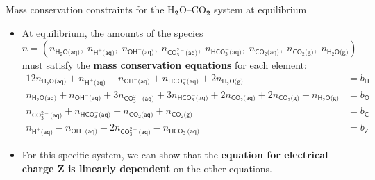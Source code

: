 %
%
\begin{frame}[<+->]{Mass conservation constraints for the H$_{\boldsymbol{2}}$O–CO$_{\boldsymbol{2}}$
system at equilibrium}
 
\begin{itemize}
\item At equilibrium, the amounts of the species
\[
n=(n_{\mathsf{H_{2}O\text{(aq)}}},\;n_{\mathsf{H^{+}\text{(aq)}}},\;n_{\mathsf{OH^{-}\text{(aq)}}},\;n_{\mathsf{CO_{3}^{2-}\text{(aq)}}},\;n_{\mathsf{HCO_{3}^{-}}\text{(aq)}},\;n_{\mathsf{CO_{2}\text{(aq)}}},\;n_{\mathsf{CO_{2}\text{(g)}}},\;n_{\mathsf{H_{2}O\text{(g)}}})
\]
must satisfy the \textbf{mass conservation equations} for each element:{\small{}
\begin{alignat}{1}
2n_{\mathsf{H_{2}O\text{(aq)}}}+n_{\mathsf{H^{+}\text{(aq)}}}+n_{\mathsf{OH^{-}\text{(aq)}}}+n_{\mathsf{HCO_{3}^{-}\text{(aq)}}}+2n_{\mathsf{H_{2}O\text{(g)}}} & =b_{\mathsf{H}}\\
n_{\mathsf{H_{2}O\text{(aq)}}}+n_{\mathsf{OH^{-}\text{(aq)}}}+3n_{\mathsf{CO_{3}^{2-}\text{(aq)}}}+3n_{\mathsf{HCO_{3}^{-}}\text{(aq)}}+2n_{\mathsf{CO_{2}\text{(aq)}}}+2n_{\mathsf{CO_{2}\text{(g)}}}+n_{\mathsf{H_{2}O\text{(g)}}} & =b_{\mathsf{O}}\\
n_{\mathsf{CO_{3}^{2-}\text{(aq)}}}+n_{\mathsf{HCO_{3}^{-}\text{(aq)}}}+n_{\mathsf{CO_{2}\text{(aq)}}}+n_{\mathsf{CO_{2}\text{(g)}}} & =b_{\mathsf{C}}\\
n_{\mathsf{H^{+}\text{(aq)}}}-n_{\mathsf{OH^{-}\text{(aq)}}}-2n_{\mathsf{CO_{3}^{2-}\text{(aq)}}}-n_{\mathsf{HCO_{3}^{-}\text{(aq)}}} & =b_{\mathsf{Z}}
\end{alignat}
}{\small\par}
\item For this specific system, we can show that 
the {\bf equation for electrical charge Z is linearly dependent} on
the other equations.

\end{itemize}
\end{frame} 
%
